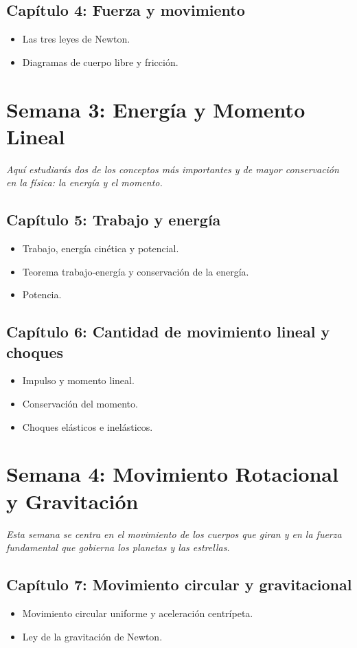 \documentclass[12pt, a4paper]{article}
\begin{document}
\subsection*{Capítulo 4: Fuerza y movimiento}
\begin{itemize}[leftmargin=*]
    \item Las tres leyes de Newton.
    \item Diagramas de cuerpo libre y fricción.
\end{itemize}

\section*{Semana 3: Energía y Momento Lineal}
\textit{Aquí estudiarás dos de los conceptos más importantes y de mayor conservación en la física: la energía y el momento.}
\subsection*{Capítulo 5: Trabajo y energía}
\begin{itemize}[leftmargin=*]
    \item Trabajo, energía cinética y potencial.
    \item Teorema trabajo-energía y conservación de la energía.
    \item Potencia.
\end{itemize}
\subsection*{Capítulo 6: Cantidad de movimiento lineal y choques}
\begin{itemize}[leftmargin=*]
    \item Impulso y momento lineal.
    \item Conservación del momento.
    \item Choques elásticos e inelásticos.
\end{itemize}

\section*{Semana 4: Movimiento Rotacional y Gravitación}
\textit{Esta semana se centra en el movimiento de los cuerpos que giran y en la fuerza fundamental que gobierna los planetas y las estrellas.}
\subsection*{Capítulo 7: Movimiento circular y gravitacional}
\begin{itemize}[leftmargin=*]
    \item Movimiento circular uniforme y aceleración centrípeta.
    \item Ley de la gravitación de Newton.
\end{itemize}
\end{document}
